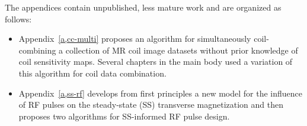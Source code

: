 \vspace{0.5em}
{\setlength{\parindent}{0ex}
The appendices contain unpublished, less mature work
and are organized as follows:}
\begin{itemize}
	\setlength\itemsep{0.5em}
	\item{%
		Appendix~\ref{a,cc-multi} proposes an algorithm
		for simultaneously coil-combining 
		a collection of MR coil image datasets
		without prior knowledge 
		of coil sensitivity maps.
		Several chapters in the main body 
		used a variation 
		of this algorithm 
		for coil data combination.
	}%
	\item{%
		Appendix~\ref{a,ss-rf} develops 
		from first principles a new model
		for the influence of RF pulses
		on the steady-state (SS) transverse magnetization
		and then proposes two algorithms
		for SS-informed RF pulse design.
	}%
\end{itemize}
